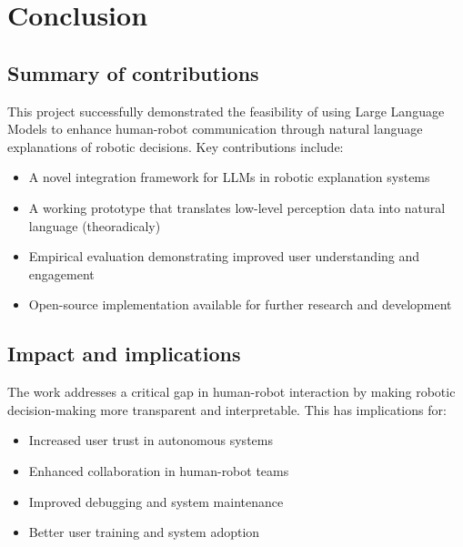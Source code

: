 \section{Conclusion}

\subsection{Summary of contributions}

This project successfully demonstrated the feasibility of using Large Language Models to enhance human-robot communication through natural language explanations of robotic decisions.
Key contributions include:

\begin{itemize}
    \item A novel integration framework for LLMs in robotic explanation systems
    \item A working prototype that translates low-level perception data into natural language (theoradicaly)
    \item Empirical evaluation demonstrating improved user understanding and engagement
    \item Open-source implementation available for further research and development
\end{itemize}

\subsection{Impact and implications}

The work addresses a critical gap in human-robot interaction by making robotic decision-making more transparent and interpretable.
This has implications for:
\begin{itemize}
    \item Increased user trust in autonomous systems
    \item Enhanced collaboration in human-robot teams
    \item Improved debugging and system maintenance
    \item Better user training and system adoption
\end{itemize}

